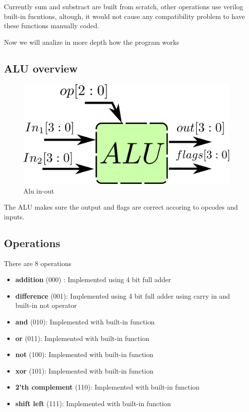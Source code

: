 Currently sum and substract are built from scratch, other operations use verilog built-in fucntions, altough, it would not cause any compatibility problem to have these functions manually coded.

Now we will analize in more depth how the program works

\subsection*{ALU overview}

\begin{figure}[H]
  \begin{centering}
  \includegraphics[scale=1]{data/alu.png}
  \par\end{centering}
  \caption{Alu in-out}
\end{figure}

The ALU makes sure the output and flags are correct accoring to opcodes and inputs.
\subsection*{Operations}
There are 8 operations
\begin{itemize}
  \item \textbf{addition} (000) : Implemented using 4 bit full adder
  \item \textbf{difference} (001): Implemented using 4 bit full adder using carry in and built-in not operator
  \item \textbf{and} (010): Implemented with built-in function
  \item \textbf{or} (011): Implemented with built-in function
  \item \textbf{not} (100): Implemented with built-in function
  \item \textbf{xor} (101): Implemented with built-in function
  \item \textbf{2'th complement} (110): Implemented with built-in function
  \item \textbf{shift left} (111): Implemented with built-in function
\end{itemize}

